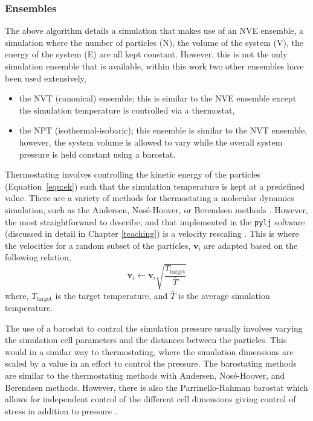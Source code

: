 \subsubsection{Ensembles}
The above algorithm details a simulation that makes use of an NVE ensemble, a simulation where the number of particles (N), the volume of the system (V), the energy of the system (E) are all kept constant.
However, this is not the only simulation ensemble that is available, within this work two other ensembles have been used extensively,
%
\begin{itemize}
\item the NVT (canonical) ensemble; this is similar to the NVE ensemble except the simulation temperature is controlled via a thermostat,
\item the NPT (isothermal-isobaric); this ensemble is similar to the NVT ensemble, however, the system volume is allowed to vary while the overall system pressure is held constant using a barostat.
\end{itemize}
%
Thermostating involves controlling the kinetic energy of the particles (Equation~\ref{equ:ek}) such that the simulation temperature is kept at a predefined value.
There are a variety of methods for thermostating a molecular dynamics simulation, such as the Andersen, Nos\'{e}-Hoover, or Berendsen methods \cite{andersen_molecular_1980,nose_unified_1984,berendsen_molecular_1984,hoover_canonical_1985}.
However, the most straightforward to describe, and that implemented in the \texttt{pylj} software (discussed in detail in Chapter \ref{teaching}) \cite{mccluskey_pylj_2018,mccluskey_arm61/pylj_2018} is a velocity rescaling \cite{bussi_canonical_2007}.
This is where the velocities for a random subset of the particles, $\mathbf{v}_i$ are adapted based on the following relation,
%
\begin{equation}
\mathbf{v}_i \leftarrow \mathbf{v}_i \sqrt{\frac{T_{\text{target}}}{\bar{T}}}
\end{equation}
%
where, $T_{\text{target}}$ is the target temperature, and $\bar{T}$ is the average simulation temperature.

The use of a barostat to control the simulation pressure usually involves varying the simulation cell parameters and the distances between the particles.
This would in a similar way to thermostating, where the simulation dimensions are scaled by a value in an effort to control the pressure.
The barostating methods are similar to the thermostating methods with Andersen, Nos\'{e}-Hoover, and Berendsen methods.
However, there is also the Parrinello-Rahman barostat which allows for independent control of the different cell dimensions giving control of stress in addition to pressure \cite{parrinello_polymorphic_1981}.

